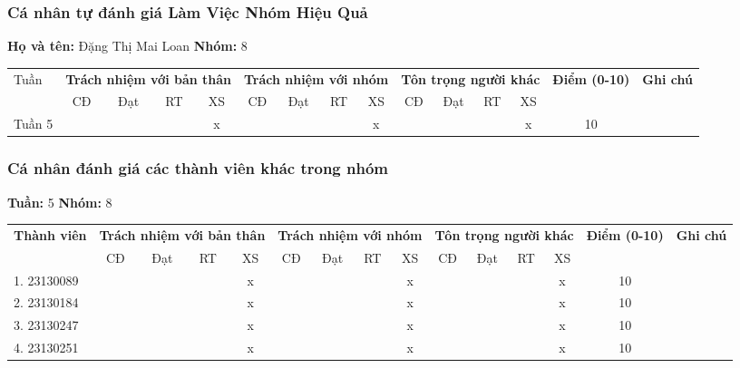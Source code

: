 \subsubsection*{Cá nhân tự đánh giá Làm Việc Nhóm Hiệu Quả}

\noindent \textbf{Họ và tên:} Đặng Thị Mai Loan \hrulefill \quad \textbf{Nhóm:} 8 \hrulefill

\vspace{0.5cm}

\begin{tabularx}{\linewidth}{|X|c|c|c|c|c|c|c|c|c|c|c|c|c|c|}
\hline
Tuần & \multicolumn{4}{c|}{\textbf{Trách nhiệm với bản thân}} & \multicolumn{4}{c|}{\textbf{Trách nhiệm với nhóm}} & \multicolumn{4}{c|}{\textbf{Tôn trọng người khác}} & \multirow{2}{1.5cm}{\textbf{Điểm (0-10)}} & \multirow{2}{1.5cm}{\textbf{Ghi chú}} \\ \cline{2-13}
 & CĐ & Đạt & RT & XS & CĐ & Đạt & RT & XS & CĐ & Đạt & RT & XS & & \\ \hline
  Tuần 5 & & & & x & & & & x & & & & x & 10 & \\ \hline
\end{tabularx}

\vspace{1cm}

\subsubsection*{Cá nhân đánh giá các thành viên khác trong nhóm}

\noindent \textbf{Tuần:} 5 \hrulefill \quad \textbf{Nhóm:} 8 \hrulefill

\vspace{0.5cm}

\begin{tabularx}{\linewidth}{|X|c|c|c|c|c|c|c|c|c|c|c|c|c|c|}
\hline
\multirow{2}{3cm}{\textbf{Thành viên}} & \multicolumn{4}{c|}{\textbf{Trách nhiệm với bản thân}} & \multicolumn{4}{c|}{\textbf{Trách nhiệm với nhóm}} & \multicolumn{4}{c|}{\textbf{Tôn trọng người khác}} & \multirow{2}{1.2cm}{\textbf{Điểm (0-10)}} & \multirow{2}{1.5cm}{\textbf{Ghi chú}} \\ \cline{2-13}
 & CĐ & Đạt & RT & XS & CĐ & Đạt & RT & XS & CĐ & Đạt & RT & XS & & \\ \hline
1. 23130089 & & & & x & & & & x & & & & x & 10 & \\ \hline
2. 23130184 & & & & x & & & & x & & & & x & 10 & \\ \hline
3. 23130247 & & & & x & & & & x & & & & x & 10 & \\ \hline
4. 23130251 & & & & x & & & & x & & & & x & 10 & \\ \hline
\end{tabularx}
